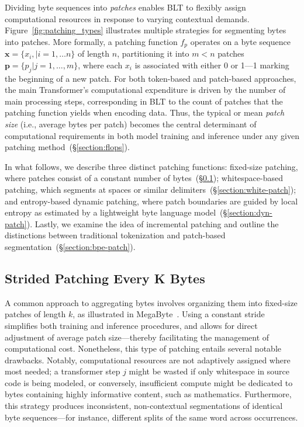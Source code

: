 Dividing byte sequences into \textit{patches} enables {\textsc BLT} to flexibly assign computational resources in response to varying contextual demands. Figure~\ref{fig:patching_types} illustrates multiple strategies for segmenting bytes into patches. More formally, a patching function $f_p$ operates on a byte sequence $\pmb{x}=\{x_i,|i=1,\ldots n\}$ of length $n$, partitioning it into $m < n$ patches $\pmb{p}=\{p_j|j=1,\ldots,m\}$, where each $x_i$ is associated with either 0 or 1—1 marking the beginning of a new patch. For both token-based and patch-based approaches, the main Transformer’s computational expenditure is driven by the number of main processing steps, corresponding in {\textsc BLT} to the count of patches that the patching function yields when encoding data. Thus, the typical or mean \textit{patch size} (i.e., average bytes per patch) becomes the central determinant of computational requirements in both model training and inference under any given patching method~(\S\ref{section:flops}).

In what follows, we describe three distinct patching functions: fixed-size patching, where patches consist of a constant number of bytes~(\S\ref{section:static-patch}); whitespace-based patching, which segments at spaces or similar delimiters~(\S\ref{section:white-patch}); and entropy-based dynamic patching, where patch boundaries are guided by local entropy as estimated by a lightweight byte language model~(\S\ref{section:dyn-patch}). Lastly, we examine the idea of incremental patching and outline the distinctions between traditional tokenization and patch-based segmentation~(\S\ref{section:bpe-patch}).

\subsection{Strided Patching Every K Bytes}
\label{section:static-patch}

A common approach to aggregating bytes involves organizing them into fixed-size patches of length $k$, as illustrated in MegaByte~\citep{yu2023megabyte}. Using a constant stride simplifies both training and inference procedures, and allows for direct adjustment of average patch size—thereby facilitating the management of computational cost. Nonetheless, this type of patching entails several notable drawbacks. Notably, computational resources are not adaptively assigned where most needed; a transformer step $j$ might be wasted if only whitespace in source code is being modeled, or conversely, insufficient compute might be dedicated to bytes containing highly informative content, such as mathematics. Furthermore, this strategy produces inconsistent, non-contextual segmentations of identical byte sequences—for instance, different splits of the same word across occurrences.

